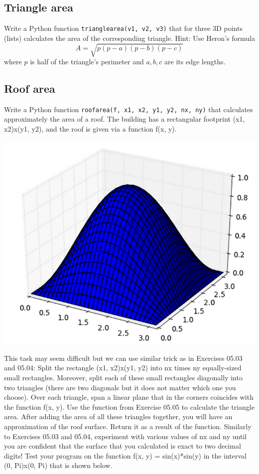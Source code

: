 
\subsection{Triangle area}

Write a Python function {\tt trianglearea(v1, v2, v3)} that for three 3D points (lists) 
calculates the area of the corresponding triangle. Hint: Use Heron's formula 
$$
A = \sqrt{p(p-a)(p-b)(p-c)}
$$
where $p$ is half of the triangle's perimeter and $a, b, c$ are its edge lengths. 


\subsection{Roof area}

Write a Python function {\tt roofarea(f, x1, x2, y1, y2, nx, ny)} that calculates approximately the area of a roof. 
The building has a rectangular footprint (x1, x2)x(y1, y2), and the roof is given via a function f(x, y). 

\begin{center}
\includegraphics[height=0.5\textwidth]{img/area-1.png}
\end{center}
\noindent
This task 
may seem difficult but we can use similar trick as in Exercises 05.03 and 05.04: Split the rectangle 
(x1, x2)x(y1, y2) into nx times ny equally-sized small rectangles. Moreover, split each of these small rectangles 
diagonally into two triangles (there are two diagonals but it does not matter which one you choose). Over each 
triangle, span a linear plane that in the corners coincides with the function f(x, y). Use the function from Exercise 
05.05 to calculate the triangle area. After adding the area of 
all these triangles together, you will have an approximation of the roof surface. Return it as a result of the function. 
Similarly to Exercises 05.03 and 05.04, experiment with various values of nx and 
ny until you are confident that the surface that you 
calculated is exact to two decimal digits! Test your program on the function f(x, y) = sin(x)*sin(y) in the interval
(0, Pi)x(0, Pi) that is shown below.

